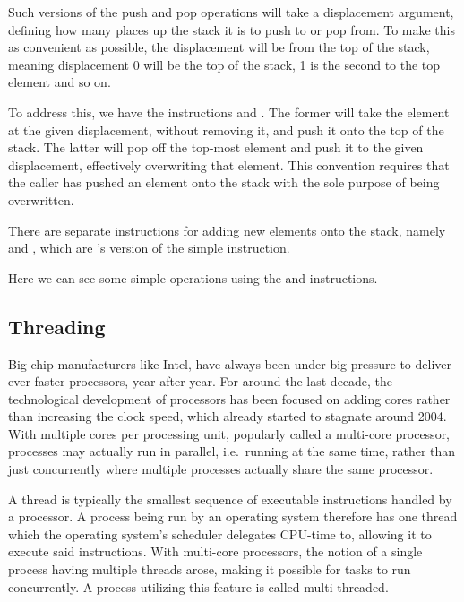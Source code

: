 Such versions of the push and pop operations will take a displacement argument,
defining how many places up the stack it is to push to or pop from. To make this
as convenient as possible, the displacement will be from the top of the stack,
meaning displacement 0 will be the top of the stack, 1 is the second to the top
element and so on.

To address this, we have the instructions  and
. The former will take the element at the given
displacement, without removing it, and push it onto the top of the stack. The
latter will pop off the top-most element and push it to the given displacement,
effectively overwriting that element. This convention requires that the caller
has pushed an element onto the stack with the sole purpose of being
overwritten.

There are separate instructions for adding new elements onto the stack, namely
 and , which are \thename{}'s version of
the simple  instruction.

Here we can see some simple operations using the  and
 instructions.
\begin{stackops}
\end{stackops}

\subsection{Threading}
\label{sec:design:threading}

Big chip manufacturers like Intel, have always been under big pressure to
deliver ever faster processors, year after year. For around the last decade, the
technological development of processors has been focused on adding cores rather
than increasing the clock speed, which already started to stagnate around
2004\cite{sutter}. With multiple cores per processing unit, popularly called a
multi-core processor, processes may actually run in parallel, i.e.~running at
the same time, rather than just concurrently where multiple processes actually
share the same processor.

A thread is typically the smallest sequence of executable instructions handled
by a processor. A process being run by an operating system therefore has one
thread which the operating system's scheduler delegates CPU-time to, allowing it
to execute said instructions. With multi-core processors, the notion of a single
process having multiple threads arose, making it possible for tasks to run
concurrently. A process utilizing this feature is called multi-threaded.

